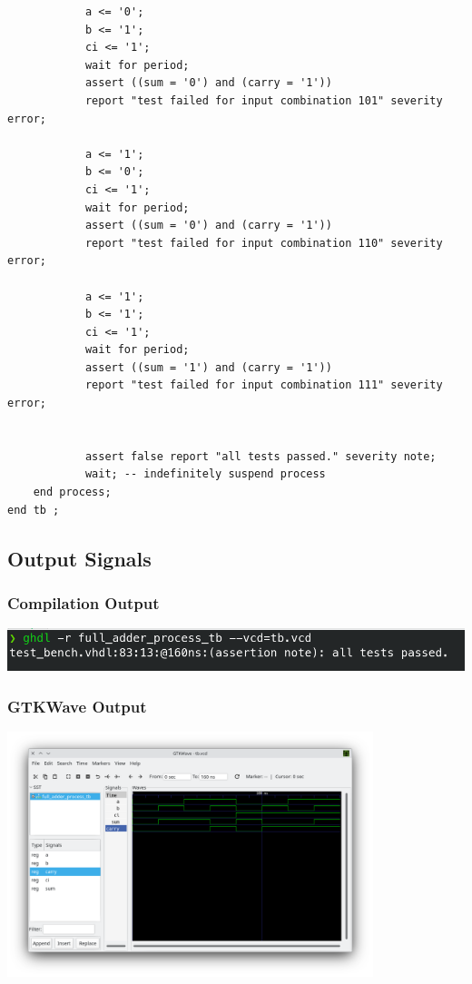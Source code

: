 \documentclass[dvipsnames, svgnames, x11names, a4paper, 11pt,]{article}
\begin{document}
\begin{lstlisting}
            a <= '0';
            b <= '1';
            ci <= '1';
            wait for period;
            assert ((sum = '0') and (carry = '1'))
            report "test failed for input combination 101" severity error;

            a <= '1';
            b <= '0';
            ci <= '1';
            wait for period;
            assert ((sum = '0') and (carry = '1'))
            report "test failed for input combination 110" severity error;
            
            a <= '1';
            b <= '1';
            ci <= '1';
            wait for period;
            assert ((sum = '1') and (carry = '1'))
            report "test failed for input combination 111" severity error;
            
            
            assert false report "all tests passed." severity note;
            wait; -- indefinitely suspend process
    end process;
end tb ;
\end{lstlisting}
\subsection{Output Signals}
\subsubsection{Compilation Output}
\begin{center}
\includegraphics[width=\textwidth]{cctb}
\end{center}
\subsubsection{GTKWave Output}
\begin{center}
    \includegraphics[width=0.8\textwidth, height=0.4\textheight]{tb}
\end{center}
\end{document}
